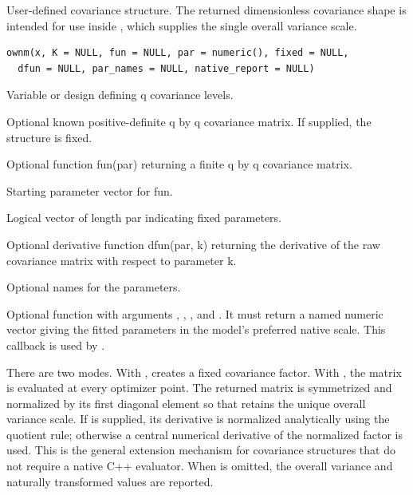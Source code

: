 \documentclass[a4paper]{book}
\begin{document}
%
\begin{Description}\relax
User-defined covariance structure. The returned dimensionless covariance shape is intended for use inside , which supplies the single overall variance scale.
\end{Description}
%
\begin{Usage}
\begin{verbatim}
ownm(x, K = NULL, fun = NULL, par = numeric(), fixed = NULL,
  dfun = NULL, par_names = NULL, native_report = NULL)
\end{verbatim}
\end{Usage}
%
\begin{Arguments}
\begin{ldescription}
\item[\code{x}] Variable or design defining q covariance levels.
\item[\code{K}] Optional known positive-definite q by q covariance matrix.  If supplied, the structure is fixed.
\item[\code{fun}] Optional function fun(par) returning a finite q by q covariance matrix.
\item[\code{par}] Starting parameter vector for fun.
\item[\code{fixed}] Logical vector of length par indicating fixed parameters.
\item[\code{dfun}] Optional derivative function dfun(par, k) returning the derivative of the raw covariance matrix with respect to parameter k.
\item[\code{par\_names}] Optional names for the parameters.
\item[\code{native\_report}] Optional function with arguments ,
, , and . It must return a named
numeric vector giving the fitted parameters in the model's preferred native
scale. This callback is used by .
\end{ldescription}
\end{Arguments}
%
\begin{Details}\relax
There are two modes.  With ,  creates a fixed covariance factor.  With , the matrix is evaluated at every optimizer point.  The returned matrix is symmetrized and normalized by its first diagonal element so that  retains the unique overall variance scale.  If  is supplied, its derivative is normalized analytically using the quotient rule; otherwise a central numerical derivative of the normalized factor is used.  This is the general extension mechanism for covariance structures that do not require a native C++ evaluator. When  is omitted, the overall variance and naturally transformed  values are reported.
\end{Details}
\end{document}
